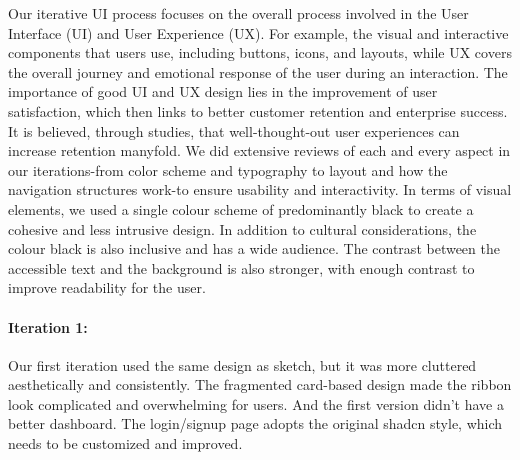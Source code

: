 Our iterative UI process focuses on the overall process involved in the User Interface (UI) and User Experience (UX). For example, the visual and interactive components that users use, including buttons, icons, and layouts, while UX covers the overall journey and emotional response of the user during an interaction. The importance of good UI and UX design lies in the improvement of user satisfaction, which then links to better customer retention and enterprise success. It is believed, through studies, that well-thought-out user experiences can increase retention manyfold.\cite{psycray2023} We did extensive reviews of each and every aspect in our iterations-from color scheme and typography to layout and how the navigation structures work-to ensure usability and interactivity. In terms of visual elements, we used a single colour scheme of predominantly black to create a cohesive and less intrusive design. In addition to cultural considerations, the colour black is also inclusive and has a wide audience. The contrast between the accessible text and the background is also stronger, with enough contrast to improve readability for the user.

\paragraph{Iteration 1:}

Our first iteration used the same design as sketch, but it was more cluttered aesthetically and consistently. The fragmented card-based design made the ribbon look complicated and overwhelming for users. And the first version didn't have a better dashboard. The login/signup page adopts the original shadcn style, which needs to be customized and improved.

